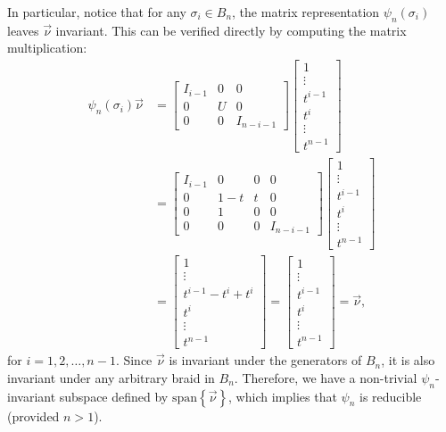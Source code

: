 In particular, notice that for any $\sigma_i\in B_n$, the matrix representation $\psi_n(\sigma_i)$ leaves $\vec{\nu}$ invariant. This can be verified directly by computing the matrix multiplication:
\begin{align*}
    \psi_n(\sigma_i)\vec{\nu} &= \begin{bmatrix}
        I_{i-1} & 0 & 0 \\
        0 & U & 0 \\
        0 & 0 & I_{n-i-1}
    \end{bmatrix}\begin{bmatrix}
        1 \\ \vdots \\ t^{i-1} \\ t^{i} \\ \vdots \\ t^{n-1}
    \end{bmatrix} \\
    &= \begin{bmatrix}
        I_{i-1} & 0 & 0 & 0 \\
        0 & 1-t & t & 0 \\
        0 & 1 & 0 & 0 \\
        0 & 0 & 0 & I_{n-i-1}
    \end{bmatrix}\begin{bmatrix}
        1 \\ \vdots \\ t^{i-1} \\ t^{i} \\ \vdots \\ t^{n-1}
    \end{bmatrix} \\
    &= \begin{bmatrix}
        1 \\ \vdots \\ t^{i-1} - {t^i} + {t^i} \\ t^{i} \\ \vdots \\ t^{n-1}
    \end{bmatrix} = \begin{bmatrix}
        1 \\ \vdots \\ t^{i-1} \\ t^{i} \\ \vdots \\ t^{n-1}
    \end{bmatrix} = \vec{\nu},
\end{align*}
for $i=1,2,\dots,n-1$. Since $\vec{\nu}$ is invariant under the generators of $B_n$, it is also invariant under any arbitrary braid in $B_n$. Therefore, we have a non-trivial $\psi_n$-invariant subspace defined by $\textrm{span}\left\{ \vec{\nu} \right\}$, which implies that $\psi_n$ is reducible (provided $n>1$).

